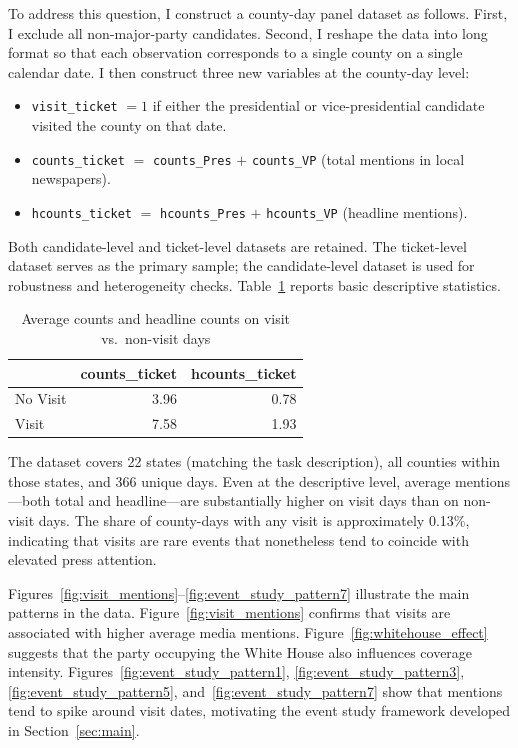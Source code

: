 \documentclass{article}
\begin{document}
To address this question, I construct a county-day panel dataset as follows.
First, I exclude all non-major-party candidates.
Second, I reshape the data into long format so that each observation corresponds to a
single county on a single calendar date.
I then construct three new variables at the county-day level:
\begin{itemize}
    \item \texttt{visit\_ticket} $= 1$ if either the presidential or vice-presidential
          candidate visited the county on that date.
    \item \texttt{counts\_ticket} $=$ \texttt{counts\_Pres} $+$ \texttt{counts\_VP}\;
          (total mentions in local newspapers).
    \item \texttt{hcounts\_ticket} $=$ \texttt{hcounts\_Pres} $+$ \texttt{hcounts\_VP}\;
          (headline mentions).
\end{itemize}
Both candidate-level and ticket-level datasets are retained.
The ticket-level dataset serves as the primary sample; the candidate-level dataset is used
for robustness and heterogeneity checks.
Table~\ref{tab:desc_stats} reports basic descriptive statistics.

\begin{table}[htbp]
\centering
\caption{Average counts and headline counts on visit vs.\ non-visit days}
\label{tab:desc_stats}
\begin{tabular}{lrr}
\toprule
 & \textbf{counts\_ticket} & \textbf{hcounts\_ticket} \\
\midrule
No Visit & 3.96 & 0.78 \\
Visit    & 7.58 & 1.93 \\
\bottomrule
\end{tabular}
\end{table}

The dataset covers 22 states (matching the task description), all counties within those
states, and 366 unique days.
Even at the descriptive level, average mentions---both total and headline---are
substantially higher on visit days than on non-visit days.
The share of county-days with any visit is approximately 0.13\%, indicating that visits
are rare events that nonetheless tend to coincide with elevated press attention.

Figures~\ref{fig:visit_mentions}--\ref{fig:event_study_pattern7} illustrate the main
patterns in the data.
Figure~\ref{fig:visit_mentions} confirms that visits are associated with higher average
media mentions.
Figure~\ref{fig:whitehouse_effect} suggests that the party occupying the White House also
influences coverage intensity.
Figures~\ref{fig:event_study_pattern1}, \ref{fig:event_study_pattern3},
\ref{fig:event_study_pattern5}, and~\ref{fig:event_study_pattern7} show that mentions tend
to spike around visit dates, motivating the event study framework developed in
Section~\ref{sec:main}.
\end{document}
